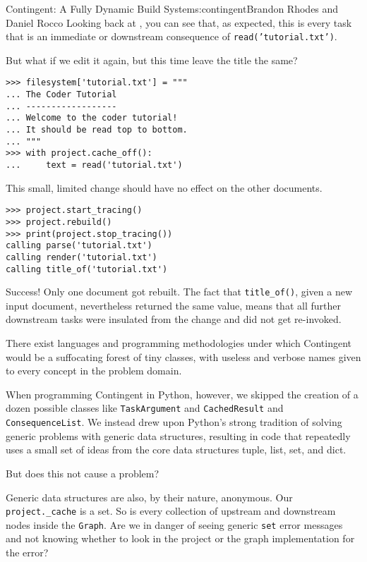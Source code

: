 \begin{aosachapter}{Contingent: A Fully Dynamic Build System}{s:contingent}{Brandon Rhodes and Daniel Rocco}
Looking back at , you can see that,
as expected, this is every task that is an immediate or downstream
consequence of \texttt{read('tutorial.txt')}.

But what if we edit it again, but this time leave the title the same?

\begin{verbatim}
>>> filesystem['tutorial.txt'] = """
... The Coder Tutorial
... ------------------
... Welcome to the coder tutorial!
... It should be read top to bottom.
... """
>>> with project.cache_off():
...     text = read('tutorial.txt')
\end{verbatim}

This small, limited change should have no effect on the other documents.

\begin{verbatim}
>>> project.start_tracing()
>>> project.rebuild()
>>> print(project.stop_tracing())
calling parse('tutorial.txt')
calling render('tutorial.txt')
calling title_of('tutorial.txt')
\end{verbatim}

Success! Only one document got rebuilt. The fact that
\texttt{title\_of()}, given a new input document, nevertheless returned
the same value, means that all further downstream tasks were insulated
from the change and did not get re-invoked.

\label{conclusion}

There exist languages and programming methodologies under which
Contingent would be a suffocating forest of tiny classes, with useless
and verbose names given to every concept in the problem domain.

When programming Contingent in Python, however, we skipped the creation
of a dozen possible classes like \texttt{TaskArgument} and
\texttt{CachedResult} and \texttt{ConsequenceList}. We instead drew upon
Python's strong tradition of solving generic problems with generic data
structures, resulting in code that repeatedly uses a small set of ideas
from the core data structures tuple, list, set, and dict.

But does this not cause a problem?

Generic data structures are also, by their nature, anonymous. Our
\texttt{project.\_cache} is a set. So is every collection of upstream
and downstream nodes inside the \texttt{Graph}. Are we in danger of
seeing generic \texttt{set} error messages and not knowing whether to
look in the project or the graph implementation for the error?


\end{aosachapter}
